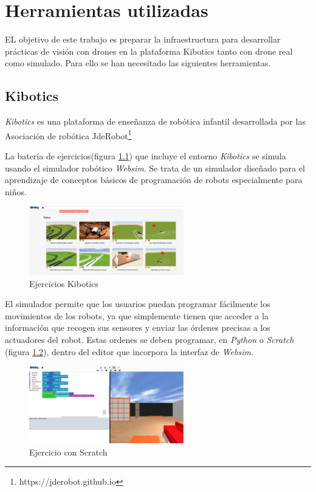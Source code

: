 \chapter{Herramientas utilizadas}\label{cap.infraestructura}
EL objetivo de este trabajo es preparar la infraestructura para desarrollar prácticas de visión con drones en la plataforma Kibotics\cite{kibotics} tanto con drone real como simulado. Para ello se han necesitado las siguientes herramientas.

\section{Kibotics}
\textit{Kibotics}\cite{kibotics} es una plataforma de enseñanza de robótica infantil desarrollada por las Asociación de robótica JdeRobot\footnote{https://jderobot.github.io}

La batería de ejercicios(figura \ref{fig:kibotics2}) que incluye el entorno \textit{Kibotics}\cite{kibotics} se simula usando el simulador robótico \textit{Websim}. Se trata de un simulador diseñado para el aprendizaje de conceptos básicos de programación de robots especialmente para niños. 
\begin{figure}[H]
  \begin{center}
    \includegraphics[width=0.6\textwidth]{figures/herramientas/kibotics2.png}
		\caption{Ejercicios Kibotics}
		\label{fig:kibotics2}
		\end{center}
\end{figure}

El simulador permite que los usuarios puedan programar fácilmente los movimientos de los robots, ya que simplemente tienen que acceder a la información que recogen sus sensores y enviar las órdenes precisas a los actuadores del robot. Estas ordenes se deben programar, en \textit{Python} o \textit{Scratch} (figura \ref{fig:kibotics1}), dentro del editor que incorpora la interfaz de \textit{Websim}.
\begin{figure}[H]
  \begin{center}
    \includegraphics[width=0.6\textwidth]{figures/herramientas/kibotics1.png}
		\caption{Ejercicio con Scratch}
		\label{fig:kibotics1}
		\end{center}
\end{figure}

